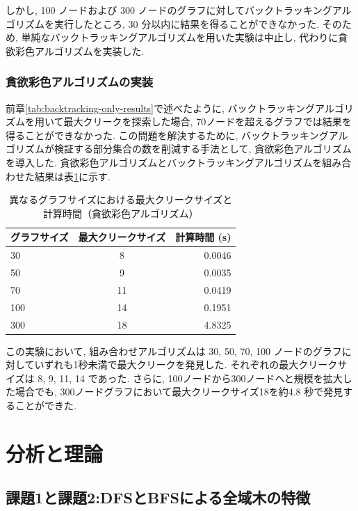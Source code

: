 \documentclass[a4j, 12pt]{jarticle}
\begin{document}
しかし, 100 ノードおよび 300 ノードのグラフに対してバックトラッキングアルゴリズムを実行したところ, 30 分以内に結果を得ることができなかった. そのため, 単純なバックトラッキングアルゴリズムを用いた実験は中止し, 代わりに貪欲彩色アルゴリズムを実装した.

\subsubsection{貪欲彩色アルゴリズムの実装}
前章\ref{tab:backtracking-only-results}で述べたように, バックトラッキングアルゴリズムを用いて最大クリークを探索した場合, 70ノードを超えるグラフでは結果を得ることができなかった. この問題を解決するために, バックトラッキングアルゴリズムが検証する部分集合の数を削減する手法として, 貪欲彩色アルゴリズムを導入した. 貪欲彩色アルゴリズムとバックトラッキングアルゴリズムを組み合わせた結果は表\ref{tab:backtracking-coloring-results}に示す.

\begin{table}[H]
\centering
\caption{異なるグラフサイズにおける最大クリークサイズと計算時間（貪欲彩色アルゴリズム）}\label{tab:backtracking-coloring-results}
\begin{tabular}{l|c|r}
\hline
\textbf{グラフサイズ} & \textbf{最大クリークサイズ} & \textbf{計算時間 (s)} \\
\hline
30  & 8  & 0.0046 \\
50  & 9  & 0.0035 \\
70  & 11 & 0.0419 \\
100 & 14 & 0.1951 \\
300 & 18 & 4.8325 \\
\hline
\end{tabular}
\end{table}

この実験において, 組み合わせアルゴリズムは 30, 50, 70, 100 ノードのグラフに対していずれも1秒未満で最大クリークを発見した. それぞれの最大クリークサイズは 8, 9, 11, 14 であった. さらに, 100ノードから300ノードへと規模を拡大した場合でも, 300ノードグラフにおいて最大クリークサイズ18を約4.8 秒で発見することができた.

\section{分析と理論}
\subsection{課題1と課題2:DFSとBFSによる全域木の特徴}
\end{document}
